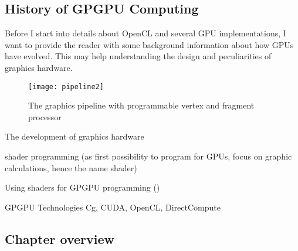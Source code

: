 \subsection{History of GPGPU Computing \cite{gpu_history}} 
Before I start into details about OpenCL and several GPU implementations, I want to provide the reader with some background information about how GPUs have evolved. This may help understanding the design and peculiarities of graphics hardware.
\\



\begin{figure} %
\centering
\texttt{[image: pipeline2]}
\caption{The graphics pipeline with programmable vertex and fragment processor}
\label{fig:pipeline2}
\end{figure}


The development of graphics hardware

shader programming (as first possibility to program for GPUs, focus on graphic calculations, hence the name shader)

Using shaders for GPGPU programming ()

GPGPU Technologies
Cg, CUDA, OpenCL, DirectCompute

\subsection{Chapter overview}


